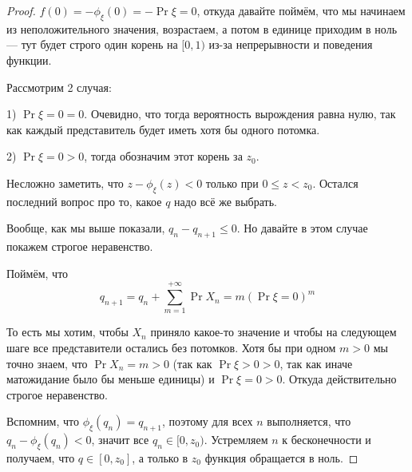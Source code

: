 \begin{proof}
  $f(0) = -\phi_{\xi}(0) = -\Pr{\xi = 0}$, откуда давайте поймём, что мы начинаем из
  неположительного значения, возрастаем, а потом в единице приходим в ноль --- 
  тут будет строго один корень на $[0, 1)$ из-за непрерывности и поведения функции.

  \begin{minipage}{0.5\textwidth}
  \end{minipage}\hfill
  \begin{minipage}{0.5\textwidth}
    Рассмотрим 2 случая:

    1) $\Pr{\xi = 0} = 0$. Очевидно, что тогда вероятность вырождения равна нулю,
    так как каждый представитель будет иметь хотя бы одного потомка. 

    2) $\Pr{\xi = 0} > 0$, тогда обозначим этот корень за $z_0$.

    Несложно заметить, что $z - \phi_{\xi}(z) < 0$ только при $0 \leq z < z_0$.
    Остался последний вопрос про то, какое $q$ надо всё же выбрать. 

    Вообще, как мы выше показали, $q_n - q_{n + 1} \leq 0$. Но давайте в этом
    случае покажем строгое неравенство.

    Поймём, что
    \[
      q_{n + 1} = q_n + \sum\limits_{m = 1}^{+\infty} \Pr{X_n = m}(\Pr{\xi = 0})^m
    \]
  \end{minipage}
  
  То есть мы хотим, чтобы $X_n$ приняло какое-то значение и чтобы на следующем
  шаге все представители остались без потомков. Хотя бы при одном $m > 0$ мы точно
  знаем, что $\Pr{X_n = m} > 0$ (так как $\Pr{\xi > 0} > 0$, так как иначе 
  матожидание было бы меньше единицы) и $\Pr{\xi = 0} > 0$.
  Откуда действительно строгое неравенство.

  Вспомним, что $\phi_{\xi}(q_n) = q_{n + 1}$, поэтому для всех $n$
  выполняется, что $q_n - \phi_{\xi}(q_n) < 0$, значит все $q_n \in [0, z_0)$.
  Устремляем $n$ к бесконечности и получаем, что $q \in [0, z_0]$, а только в $z_0$
  функция обращается в ноль.
\end{proof}

